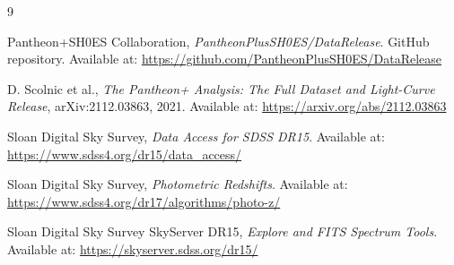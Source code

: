 \documentclass[11pt,a4paper]{article}
\begin{document}
\begin{thebibliography}{9}

Pantheon+SH0ES Collaboration, \textit{PantheonPlusSH0ES/DataRelease}. GitHub repository. Available at: \url{https://github.com/PantheonPlusSH0ES/DataRelease}

D. Scolnic et al., \textit{The Pantheon+ Analysis: The Full Dataset and Light-Curve Release}, arXiv:2112.03863, 2021. Available at: \url{https://arxiv.org/abs/2112.03863}

Sloan Digital Sky Survey, \textit{Data Access for SDSS DR15}. Available at: \url{https://www.sdss4.org/dr15/data_access/}

Sloan Digital Sky Survey, \textit{Photometric Redshifts}. Available at: \url{https://www.sdss4.org/dr17/algorithms/photo-z/}

Sloan Digital Sky Survey SkyServer DR15, \textit{Explore and FITS Spectrum Tools}. Available at: \url{https://skyserver.sdss.org/dr15/}

\end{thebibliography}
\end{document}
